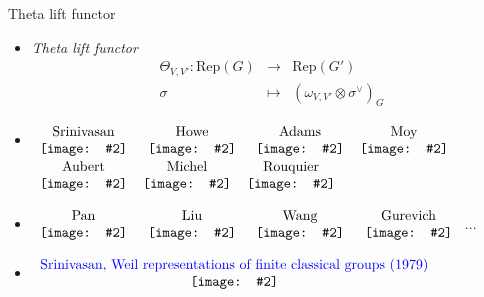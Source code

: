 \documentclass[t,mathserif,11pt,usenames,dvipsnames]{beamer}
\theoremstyle{plain}
\theoremstyle{definition}
\def\Rep{{\mathrm{Rep}}}
\def\blue{\color{blue}}
\let\oldemph\emph
\def\emph#1{\oldemph{\blue #1}}
\def\hhgraph#1#2#3{\ensuremath{\begin{array}{c}\text{#3}\\
        \hbox{\texttt{[image: \#2]}}
        \end{array}}}
\begin{document}
\begin{frame}{Theta lift functor}
  \begin{itemize}
    \item[] \emph{Theta lift functor} %
          \[
          \begin{array}{rcl}
            \Theta_{V,V'} \colon \Rep(G)  & \longrightarrow & \Rep(G')  \\
            \sigma & \mapsto & \left(\omega_{V,V'}\otimes\sigma^{\vee} \right)_{G}
          \end{array}
          \] \pause
    \item[] \hspace{-3em} $\hhgraph{0.12\textwidth}{Srini2}{Srinivasan}$\hspace{-.5em}
 $\hhgraph{0.09\textwidth}{Howe}{Howe}$
$\hhgraph{0.09\textwidth}{Adams}{Adams}$\hspace{-.5em}$\hhgraph{0.1\textwidth}{Moy}{Moy}$
$\hhgraph{0.09\textwidth}{Aubert}{Aubert}$\hspace{-.5em}$\hhgraph{0.09\textwidth}{Michel}{Michel}$\hspace{-.5em}$\hhgraph{0.09\textwidth}{Rouquier}{Rouquier}$
\item[] \hspace{-2em}
$\hhgraph{0.09\textwidth}{Pan}{Pan}$
$\hhgraph{0.09\textwidth}{Liu}{Liu}$\hspace{-.5em}
$\hhgraph{0.09\textwidth}{Wang}{Wang}$
$\hhgraph{0.09\textwidth}{Gurevich}{Gurevich}$
          ...\pause
    \item[]\hspace{-2em}
          $\hhgraph{0.2\textwidth}{Srini-paper}{{\color{blue}Srinivasan, Weil representations of finite classical groups (1979)}}$
  \end{itemize}
\end{frame}

\def\wtcV{{\widetilde{\cV}}}
\end{document}
